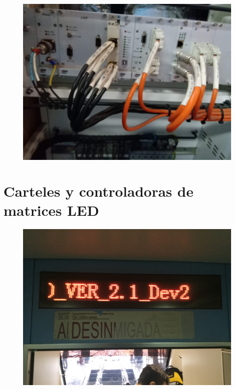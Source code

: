 \begin{figure}[ht]
	\centering
	\includegraphics[width=1\textwidth , angle=90]{./Figures/rackPIDS2.jpg}
	\caption{}
	\label{fig:rackPIDS2}
\end{figure}


\pagebreak
\section{Carteles y controladoras de matrices LED}

\begin{figure}[ht]
	\centering
	\includegraphics[width=1\textwidth]{./Figures/cartelIniciando.JPG}
	\caption{}
	\label{fig:cartelIniciando}
\end{figure}

